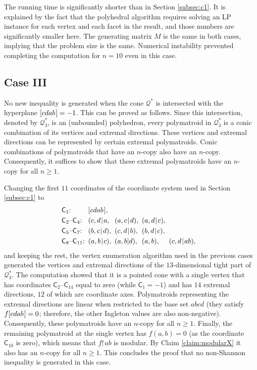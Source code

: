 \documentclass[reqno]{amsart}
\theoremstyle{definition}
\newcommand\tsp{\mkern 1.5mu}
\def\|{\mkern1.5mu{|}\mkern1.5mu}
\def\restr{\mathord\upharpoonright}
\renewcommand\ge{\geqslant}\renewcommand\le{\leqslant}
\newcommand\Co{\mathsf C} %
\def\cdab{[cdab\tsp]}
\begin{document}
The running time is significantly shorter than in Section \ref{subsec:c1}.
It is explained by the fact that the polyhedral algorithm requires solving
an LP instance for each vertex and each facet in the result, and those
numbers are significantly smaller here. The generating matrix $M$ is the
same in both cases, implying that the problem size is the same. Numerical
instability prevented completing the computation for $n=10$ even in this
case.

\subsection{Case III}

No new inequality is generated when the cone $\mathcal Q^*$ is intersected
with the hyperplane $\cdab=-1$. This can be proved as follows. Since this
intersection, denoted by $\mathcal Q^*_3$, is an (unbounded) polyhedron,
every polymatroid in $\mathcal Q^*_3$ is a conic combination of its vertices
and extremal directions. These vertices and extremal directions can be
represented by certain extremal polymatroids. Conic combinations of
polymatroids that have an $n$-copy also have an $n$-copy. Consequently, it
suffices to show that these extremal polymatroids have an $n$-copy for all
$n\ge 1$.

Changing the first $11$ coordinates of the coordinate system used in Section
\ref{subsec:c1} to
$$\mathcode`\:="3A\setlength\arraycolsep{2.5pt}%
\begin{array}{llllll}
 \Co_1: & \cdab, \\[3pt]
 \Co_2\mbox{--}\Co_4: & (c,d\|a, & (a,c\|d), & (a,d\|c), \\[3pt]
 \Co_5\mbox{--}\Co_7: & (b,c\|d), & (c,d\|b), & (b,d\|c), \\[3pt]
 \Co_8\mbox{--}\Co_{11}: & (a,b\|c), & (a,b|d),& (a,b), & (c,d\|ab),
\end{array}$$
and keeping the rest, the vertex enumeration algorithm used in the previous
cases generated the vertices and extremal directions of the $13$-dimensional
tight part of $\mathcal Q^*_3$. The computation showed that it is a pointed
cone with a single vertex that has coordinates $\Co_2\mbox{--}\Co_{14}$
equal to zero (while $\Co_1=-1$) and has $14$ extremal directions, $12$ of
which are coordinate axes. Polymatroids representing the extremal directions
are linear when restricted to the base set $abcd$ (they satisfy $f\cdab=0$;
therefore, the other Ingleton values are also non-negative). Consequently,
these polymatroids have an $n$-copy for all $n\ge 1$. Finally, the remaining
polymatroid at the single vertex has $f(a,b)=0$ (as the coordinate
$\Co_{10}$ is zero), which means that $f\restr ab$ is modular. By Claim
\ref{claim:modularX} it also has an $n$-copy for all $n\ge 1$. This
concludes the proof that no non-Shannon inequality is generated in this
case.
\end{document}
